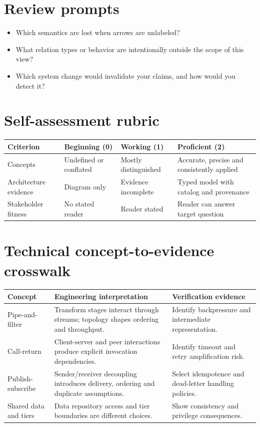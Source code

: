 \documentclass[10pt,letterpaper]{article}
\begin{document}
\section{Review prompts}
\begin{itemize}
\item Which semantics are lost when arrows are unlabeled?
\item What relation types or behavior are intentionally outside the scope of this view?
\item Which system change would invalidate your claims, and how would you detect it?
\end{itemize}
\section{Self-assessment rubric}
\small
\begin{tabularx}{\linewidth}{@{}YYYY@{}}
\toprule
\textbf{Criterion} & \textbf{Beginning (0)} & \textbf{Working (1)} & \textbf{Proficient (2)} \\
\midrule
Concepts & Undefined or conflated & Mostly distinguished & Accurate, precise and consistently applied \\
Architecture evidence & Diagram only & Evidence incomplete & Typed model with catalog and provenance \\
Stakeholder fitness & No stated reader & Reader stated & Reader can answer target question \\
\bottomrule
\end{tabularx}
\normalsize
\section{Technical concept-to-evidence crosswalk}
\small
\begin{tabularx}{\linewidth}{@{}YYY@{}}
\toprule
\textbf{Concept} & \textbf{Engineering interpretation} & \textbf{Verification evidence} \\
\midrule
Pipe-and-filter & Transform stages interact through streams; topology shapes ordering and throughput. & Identify backpressure and intermediate representation. \\
Call-return & Client-server and peer interactions produce explicit invocation dependencies. & Identify timeout and retry amplification risk. \\
Publish-subscribe & Sender/receiver decoupling introduces delivery, ordering and duplicate assumptions. & Select idempotence and dead-letter handling policies. \\
Shared data and tiers & Data repository access and tier boundaries are different choices. & Show consistency and privilege consequences. \\
\bottomrule
\end{tabularx}
\normalsize
\end{document}
